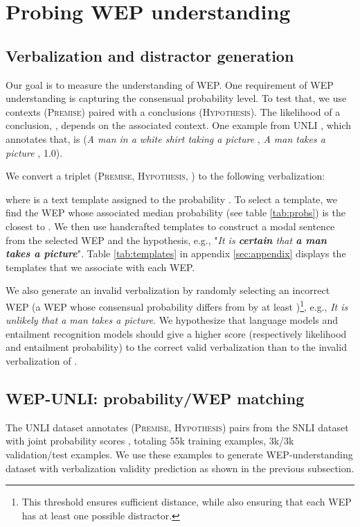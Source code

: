 \documentclass[11pt]{article}
\begin{document}
\section{Probing WEP understanding}
\subsection{Verbalization and distractor generation \label{sec:verbalization}}

Our goal is to measure the understanding of WEP. One requirement of WEP understanding is capturing the consensual probability level. To test that, we use contexts (\textsc{Premise}) paired with a conclusions (\textsc{Hypothesis}). The likelihood of a conclusion, , depends on the associated context. One example from UNLI \citep{chen-etal-2020-uncertain}, which annotates that, is (\textit{A man in a white shirt taking a picture
}, \textit{A man takes a picture }, 1.0). 

We convert a triplet (\textsc{Premise}, \textsc{Hypothesis}, )
to the following verbalization:\vspace{-3mm}



where   is a text template assigned to the probability . To select a template, we find the WEP whose associated median probability (see table \ref{tab:probs}) is the closest to . We then use handcrafted templates to construct a modal sentence from the selected WEP and the hypothesis, e.g., "\textit{It is  \textbf{certain} that \textbf{a man takes a picture}}". Table \ref{tab:templates} in appendix \ref{sec:appendix} displays the templates that we associate with each WEP. 

We also generate an invalid verbalization by randomly selecting an incorrect WEP (a WEP whose consensual probability differs from  by at least )\footnote{This threshold ensures sufficient distance, while also ensuring that each WEP has at least one possible distractor.}, e.g., \textit{It is unlikely that a man takes a picture}. We hypothesize that language models and entailment recognition models should give a higher score (respectively likelihood and entailment probability) to the correct valid verbalization than to the invalid verbalization of .

\subsection{WEP-UNLI: probability/WEP matching}

The UNLI dataset annotates (\textsc{Premise}, \textsc{Hypothesis}) pairs from the SNLI dataset \citep{bowman-etal-2015-large} with joint probability scores , totaling 55k training examples, 3k/3k validation/test examples. We use these examples to generate WEP-understanding dataset with verbalization validity prediction as shown in the previous subsection.
\end{document}
